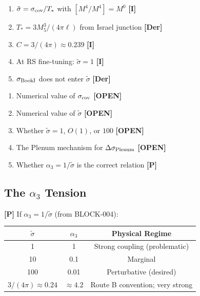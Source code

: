 \documentclass[11pt,a4paper]{article}
\newcommand{\tagDer}{\textcolor{derivedblue}{\textbf{[Der]}}}
\newcommand{\tagI}{\textcolor{mathpurple}{\textbf{[I]}}}
\newcommand{\tagP}{\textcolor{proposedred}{\textbf{[P]}}}
\newcommand{\tagOPEN}{\textcolor{openred}{\textbf{[OPEN]}}}
\theoremstyle{definition}
\theoremstyle{remark}
\begin{document}
\begin{tcolorbox}[colback=green!5!white, colframe=green!60!black,
  title={\textbf{What IS Derived}}]
\begin{enumerate}
\item $\tilde\sigma = \sigma_{\rm cov}/T_*$ with $[M^4/M^4] = M^0$
  \checkmark \hfill \tagI
\item $T_* = 3M_5^3/(4\pi\ell)$ from Israel junction \hfill \tagDer
\item $C = 3/(4\pi) \approx 0.239$ \hfill \tagI
\item At RS fine-tuning: $\tilde\sigma = 1$ \hfill \tagI
\item $\sigma_{\rm BookI}$ does not enter $\tilde\sigma$ \hfill \tagDer
\end{enumerate}
\end{tcolorbox}

\begin{tcolorbox}[colback=red!5!white, colframe=red!60!black,
  title={\textbf{What is NOT Derived}}]
\begin{enumerate}
\item Numerical value of $\sigma_{\rm cov}$ \hfill \tagOPEN
\item Numerical value of $\tilde\sigma$ \hfill \tagOPEN
\item Whether $\tilde\sigma = 1$, $O(1)$, or $100$ \hfill \tagOPEN
\item The Plenum mechanism for $\Delta\sigma_{\rm Plenum}$ \hfill \tagOPEN
\item Whether $\alpha_3 = 1/\tilde\sigma$ is the correct relation
  \hfill \tagP
\end{enumerate}
\end{tcolorbox}

\subsection{The $\alpha_3$ Tension}

\tagP{} If $\alpha_3 = 1/\tilde\sigma$ (from BLOCK-004):

\begin{center}
\begin{tabular}{ccc}
\toprule
$\tilde\sigma$ & $\alpha_3$ & Physical Regime \\
\midrule
1 & 1 & Strong coupling (problematic) \\
10 & 0.1 & Marginal \\
100 & 0.01 & Perturbative (desired) \\
$3/(4\pi) \approx 0.24$ & $\approx 4.2$ & Route B convention; very strong \\
\bottomrule
\end{tabular}
\end{center}
\end{document}
